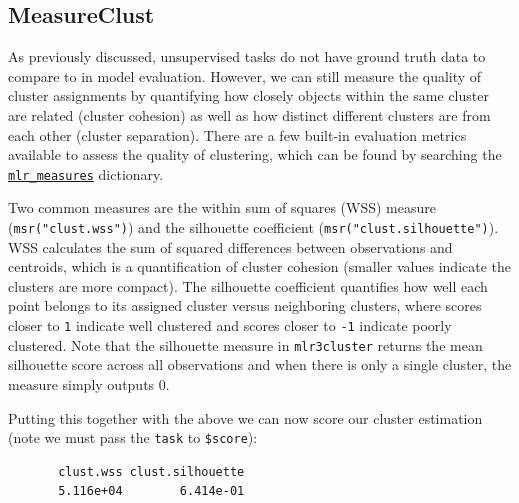\hypertarget{measureclust}{%
\subsection{MeasureClust}\label{measureclust}}

As previously discussed, unsupervised tasks do not have ground truth
data to compare to in model evaluation. However, we can still measure
the quality of cluster assignments by quantifying how closely objects
within the same cluster are related (cluster
cohesion) as well as how distinct different
clusters are from each other (cluster
separation). There are a few built-in
evaluation metrics available to assess the quality of clustering, which
can be found by searching the
\href{https://mlr3.mlr-org.com/reference/mlr_measures.html}{\texttt{mlr\_measures}}
dictionary.

Two common measures are the within sum of squares (WSS) measure
(\texttt{msr("clust.wss")}) and the silhouette coefficient
(\texttt{msr("clust.silhouette")}). WSS calculates the sum of squared
differences between observations and centroids, which is a
quantification of cluster cohesion (smaller values indicate the clusters
are more compact). The silhouette coefficient quantifies how well each
point belongs to its assigned cluster versus neighboring clusters, where
scores closer to \texttt{1} indicate well clustered and scores closer to
\texttt{-1} indicate poorly clustered. Note that the silhouette measure
in \texttt{mlr3cluster} returns the mean silhouette score across all
observations and when there is only a single cluster, the measure simply
outputs 0.

Putting this together with the above we can now score our cluster
estimation (note we must pass the \texttt{task} to \texttt{\$score}):

\begin{Shaded}
\begin{Highlighting}[]
\OtherTok{=} \NormalTok{(}\NormalTok{(}\NormalTok{, }\NormalTok{))}

\SpecialCharTok{$}
\end{Highlighting}
\end{Shaded}

\begin{verbatim}
       clust.wss clust.silhouette 
       5.116e+04        6.414e-01 
\end{verbatim}

